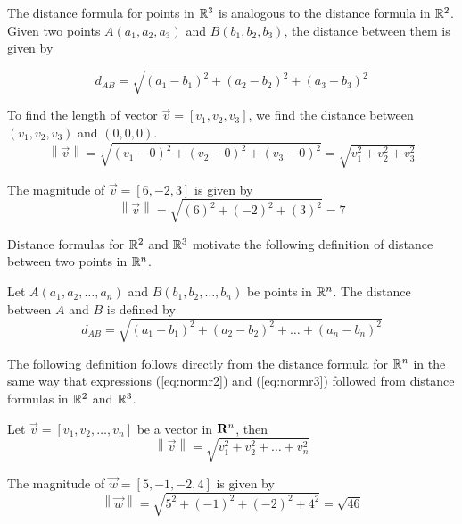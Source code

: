 \documentclass{ximera}
\newcommand\norm[1]{\left\lVert#1\right\rVert}
\begin{document}
The distance formula for points in $\mathbb{R}^3$ is analogous to the distance formula in $\mathbb{R}^2$.  Given two points $A(a_1, a_2, a_3)$ and $B(b_1, b_2, b_3)$, the distance between them is given by 

\begin{equation*}
d_{AB}=\sqrt{(a_1-b_1)^2+(a_2-b_2)^2+(a_3-b_3)^2}
\end{equation*}

To find the length of vector $\vec{v}=[v_1, v_2, v_3]$, we find the distance between $(v_1, v_2, v_3)$ and $(0, 0, 0)$.
\begin{equation}\label{eq:normr3}
\norm{\vec{v}}=\sqrt{(v_1-0)^2+(v_2-0)^2+(v_3-0)^2}=\sqrt{v_1^2+v_2^2+v_3^2}
\end{equation}

\begin{example}
The magnitude of $\vec{v}=[6,-2,3]$ is given by
$$
\norm{\vec{v}}=\sqrt{(6)^2+(-2)^2+(3)^2}=7
$$
\end{example}


Distance formulas for $\mathbb{R}^2$ and $\mathbb{R}^3$ motivate the following definition of distance between two points in $\mathbb{R}^n$.

  \begin{definition} \label{def:distrn} Let $A(a_1, a_2,\ldots, a_n)$ and $B(b_1, b_2,\ldots, b_n)$ be points in $\mathbb{R}^n$.  The distance between $A$ and $B$ is defined by 
\begin{equation*}
d_{AB}=\sqrt{(a_1-b_1)^2+(a_2-b_2)^2+\ldots +(a_n-b_n)^2}
\end{equation*}
\end{definition}

The following definition follows directly from the distance formula for $\mathbb{R}^n$ in the same way that expressions (\ref{eq:normr2}) and (\ref{eq:normr3}) followed from distance formulas in $\mathbb{R}^2$ and $\mathbb{R}^3$.  
\begin{definition}\label{def:normrn}
Let $\vec{v}=[v_1, v_2, \ldots ,v_n]$ be a vector in ${\bf R}^n$, then
\begin{equation} \label{eq:normrn}
\norm{\vec{v}}=\sqrt{v_1^2+v_2^2+\ldots +v_n^2}
\end{equation}
\end{definition}

\begin{example}
The magnitude of $\vec{w}=[5, -1, -2, 4]$ is given by
 $$\norm{\vec{w}}=\sqrt{5^2+(-1)^2+(-2)^2+4^2}=\sqrt{46}$$ 
\end{example}
\end{document}
